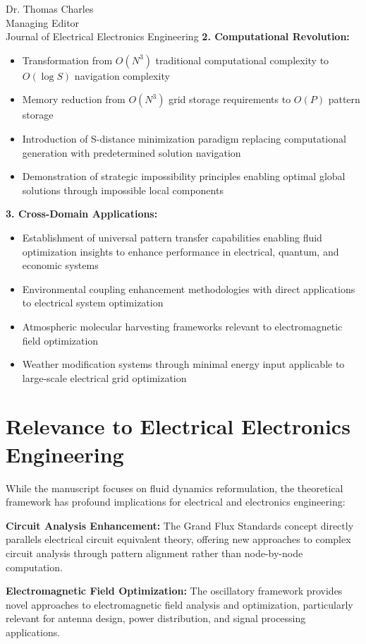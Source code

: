 \documentclass[12pt,a4paper]{letter}
\begin{document}
\begin{letter}{Dr. Thomas Charles\\
Managing Editor\\
Journal of Electrical Electronics Engineering}
\textbf{2. Computational Revolution:}
\begin{itemize}
\item Transformation from $O(N^3)$ traditional computational complexity to $O(\log S)$ navigation complexity
\item Memory reduction from $O(N^3)$ grid storage requirements to $O(P)$ pattern storage
\item Introduction of S-distance minimization paradigm replacing computational generation with predetermined solution navigation
\item Demonstration of strategic impossibility principles enabling optimal global solutions through impossible local components
\end{itemize}

\textbf{3. Cross-Domain Applications:}
\begin{itemize}
\item Establishment of universal pattern transfer capabilities enabling fluid optimization insights to enhance performance in electrical, quantum, and economic systems
\item Environmental coupling enhancement methodologies with direct applications to electrical system optimization
\item Atmospheric molecular harvesting frameworks relevant to electromagnetic field optimization
\item Weather modification systems through minimal energy input applicable to large-scale electrical grid optimization
\end{itemize}

\section*{Relevance to Electrical Electronics Engineering}

While the manuscript focuses on fluid dynamics reformulation, the theoretical framework has profound implications for electrical and electronics engineering:

\textbf{Circuit Analysis Enhancement:} The Grand Flux Standards concept directly parallels electrical circuit equivalent theory, offering new approaches to complex circuit analysis through pattern alignment rather than node-by-node computation.

\textbf{Electromagnetic Field Optimization:} The oscillatory framework provides novel approaches to electromagnetic field analysis and optimization, particularly relevant for antenna design, power distribution, and signal processing applications.


\end{letter}
\end{document}
